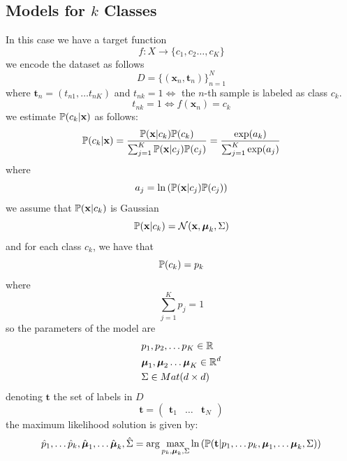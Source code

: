 \documentclass[10pt, letterpaper]{report}
\begin{document}
\subsection{Models for $k$ Classes}
In this case we have a target function\begin{equation}
    f:X\rightarrow\{c_1,c_2\dots,c_K\}
\end{equation}
we encode the dataset as follows\begin{equation}
    D=\{(\mathbf x_n,\mathbf t_n)\}_{n=1}^N
\end{equation}
where $\mathbf t_n=(t_{n1},\dots t_{nK})$ and $t_{nk}=1\iff$ the $n$-th sample is labeled as class $c_k$.\begin{equation}
     t_{nk}=1\iff f(\mathbf x_n)=c_k
\end{equation}
we estimate ${\mathbb P}(c_k|\mathbf x)$ as follows:\begin{equation}
    {\mathbb P}(c_k|\mathbf x)=\frac{{\mathbb P}(\mathbf x|c_k){\mathbb P}(c_k)}{\sum_{j=1}^K{\mathbb P}(\mathbf x|c_j){\mathbb P}(c_j)}=\frac{\exp(a_k)}{\sum_{j=1}^K\exp(a_j)}
\end{equation}
where\begin{equation}
    a_j=\ln\left({\mathbb P}(\mathbf x|c_j){\mathbb P}(c_j)\right)
\end{equation}
we assume that ${\mathbb P}(\mathbf x|c_k)$ is Gaussian\begin{equation}
    {\mathbb P}(\mathbf x|c_k)=\mathcal N(\mathbf x,{\boldsymbol{\mu}}_k,\Sigma)
\end{equation}
and for each class $c_k$, we have that\begin{equation}
    {\mathbb P}(c_k)=p_k 
\end{equation}
where \begin{equation}
    \sum_{j=1}^Kp_j=1
\end{equation}
so the parameters of the model are\begin{align}
    &p_1,p_2,\dots p_K\in {\mathbb R}\\
    &{\boldsymbol{\mu}}_1,{\boldsymbol{\mu}}_2\dots {\boldsymbol{\mu}}_K\in{\mathbb R}^d\\ 
    &\Sigma\in Mat(d\times d)
\end{align}
denoting $\mathbf t$ the set of labels in $D$\begin{equation}
    \mathbf t = \begin{pmatrix}
        \mathbf t_1 & \dots & \mathbf t_N
    \end{pmatrix}
\end{equation}
the maximum likelihood solution is given by:\begin{equation}
    \hat p_1,\dots \hat p_k,\hat {{\boldsymbol{\mu}}}_1,\dots \hat {{\boldsymbol{\mu}}}_k,\hat \Sigma=\arg\max_{p_k,{\boldsymbol{\mu}}_k,\Sigma}\ln\left(
    {\mathbb P}(\mathbf t|p_1,\dots p_k,{\boldsymbol{\mu}}_1,\dots {\boldsymbol{\mu}}_k,\Sigma)
    \right)
\end{equation}
\end{document}
